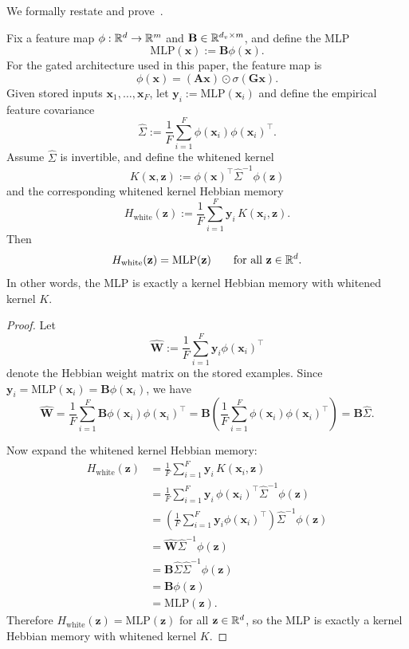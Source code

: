 \label{app:theory:proof:mlp-hebb-whiten}
We formally restate and prove~.

\begin{theorem}
Fix a feature map $\phi:\mathbb{R}^d\to\mathbb{R}^m$ and $\mathbf{B}\in\mathbb{R}^{d_{v}\times m}$, and define
the MLP
\[
\mathrm{MLP}(\mathbf{x}):=\mathbf{B}\phi(\mathbf{x}).
\]
For the gated architecture used in this paper, the feature map is
\[
\phi(\mathbf{x})=(\mathbf{A}\mathbf{x})\odot \sigma(\mathbf{G}\mathbf{x}).
\]
Given stored inputs $\mathbf{x}_{1},\dots,\mathbf{x}_{F}$, let $\mathbf{y}_{i}:=\mathrm{MLP}(\mathbf{x}_{i})$ and define the
empirical feature covariance
\[
\hat\Sigma:=\frac1F\sum_{i=1}^F \phi(\mathbf{x}_{i})\phi(\mathbf{x}_{i})^\top.
\]
Assume $\hat\Sigma$ is invertible, and define the whitened kernel
\[
K(\mathbf{x},\mathbf{z}):=\phi(\mathbf{x})^\top\hat\Sigma^{-1}\phi(\mathbf{z})
\]
and the corresponding whitened kernel Hebbian memory
\[
H_{\mathrm{white}}(\mathbf{z}):=\frac1F\sum_{i=1}^F \mathbf{y}_{i}\,K(\mathbf{x}_{i},\mathbf{z}).
\]
Then
\[
H_{\mathrm{white}}(\mathbf{z})=\mathrm{MLP}(\mathbf{z})\qquad\text{for all } \mathbf{z}\in\mathbb{R}^d.
\]
In other words, the MLP is exactly a kernel Hebbian memory
with whitened kernel $K$.
\end{theorem}

\begin{proof}
Let
\[
\hat{\mathbf{W}}:=\frac1F\sum_{i=1}^F \mathbf{y}_{i}\phi(\mathbf{x}_{i})^\top
\]
denote the Hebbian weight matrix on the stored examples. Since
$\mathbf{y}_{i}=\mathrm{MLP}(\mathbf{x}_{i})=\mathbf{B}\phi(\mathbf{x}_{i})$, we have
\[
\hat{\mathbf{W}}
=
\frac1F\sum_{i=1}^F \mathbf{B}\phi(\mathbf{x}_{i})\phi(\mathbf{x}_{i})^\top
=
\mathbf{B}\left(\frac1F\sum_{i=1}^F \phi(\mathbf{x}_{i})\phi(\mathbf{x}_{i})^\top\right)
=
\mathbf{B}\hat\Sigma.
\]

Now expand the whitened kernel Hebbian memory:
\begin{align*}
H_{\mathrm{white}}(\mathbf{z})
&=
\frac1F\sum_{i=1}^F \mathbf{y}_{i}\,K(\mathbf{x}_{i},\mathbf{z}) \\
&=
\frac1F\sum_{i=1}^F \mathbf{y}_{i}\,\phi(\mathbf{x}_{i})^\top\hat\Sigma^{-1}\phi(\mathbf{z}) \\
&=
\left(\frac1F\sum_{i=1}^F \mathbf{y}_{i}\phi(\mathbf{x}_{i})^\top\right)\hat\Sigma^{-1}\phi(\mathbf{z}) \\
&=
\hat{\mathbf{W}}\hat\Sigma^{-1}\phi(\mathbf{z}) \\
&=
\mathbf{B}\hat\Sigma\hat\Sigma^{-1}\phi(\mathbf{z}) \\
&=
\mathbf{B}\phi(\mathbf{z}) \\
&=
\mathrm{MLP}(\mathbf{z}).
\end{align*}
Therefore $H_{\mathrm{white}}(\mathbf{z})=\mathrm{MLP}(\mathbf{z})$ for all $\mathbf{z}\in\mathbb{R}^d$, so the
MLP is exactly a kernel Hebbian memory with whitened kernel $K$.
\end{proof}
